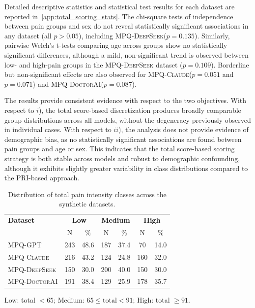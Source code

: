 \documentclass[preprint,12pt,authoryear]{elsarticle}
\newcommand{\dbGPT}{\small\textsc{MPQ-GPT}\xspace}
\newcommand{\dbClaude}{\small\textsc{MPQ-Claude}\xspace}
\newcommand{\dbDeepSeek}{\small\textsc{MPQ-DeepSeek}\xspace}
\newcommand{\dbDoctorAI}{\small\textsc{MPQ-DoctorAI}\xspace}
\begin{document}
Detailed descriptive statistics and statistical test results for each dataset are reported in~\ref{app:total_scoring_stats}. The chi-square tests of independence between pain groups and sex do not reveal statistically significant associations in any dataset (all $p > 0.05$), including \dbDeepSeek ($p = 0.135$). Similarly, pairwise Welch’s t-tests comparing age across groups show no statistically significant differences, although a mild, non-significant trend is observed between low- and high-pain groups in the \dbDeepSeek dataset ($p = 0.109$). Borderline but non-significant effects are also observed for \dbClaude ($p = 0.051$ and $p = 0.071$) and \dbDoctorAI ($p = 0.087$).

The results provide consistent evidence with respect to the two objectives. With respect to $i$), the total score-based discretization produces broadly comparable group distributions across all models, without the degeneracy previously observed in individual cases. With respect to $ii$), the analysis does not provide evidence of demographic bias, as no statistically significant associations are found between pain groups and age or sex. This indicates that the total score-based scoring strategy is both stable across models and robust to demographic confounding, although it exhibits slightly greater variability in class distributions compared to the PRI-based approach.

\begin{table}[t!]
\centering
    \renewcommand{\arraystretch}{1} 
    \setlength{\tabcolsep}{10pt}
\begin{tabular}{p{4cm} cccccc}
\toprule
\textbf{Dataset} & \multicolumn{2}{c}{\textbf{Low}} & \multicolumn{2}{c}{\textbf{Medium}} & \multicolumn{2}{c}{\textbf{High}} \\
 & N & \% & N & \% & N & \% \\
\midrule

\dbGPT   & 243 & 48.6 & 187 & 37.4 &  70 & 14.0 \\
\dbClaude  & 216 & 43.2 & 124 & 24.8 & 160 & 32.0 \\
\dbDeepSeek & 150 & 30.0 & 200 & 40.0 & 150 & 30.0 \\
\dbDoctorAI    & 191 & 38.4 & 129 & 25.9 & 178 & 35.7 \\
\bottomrule
\end{tabular}
\vspace{0.2cm}

\scriptsize{Low: total $< 65$; Medium: $65 \leq \text{total} < 91$; High: total $\geq 91$.}
\caption{Distribution of total pain intensity classes across the synthetic datasets.\label{tab:total_class_distribution}}
\end{table}
\end{document}
